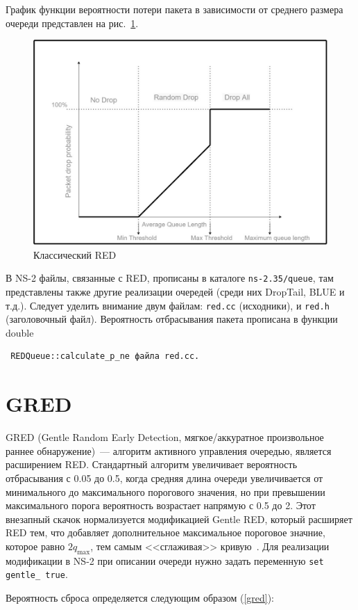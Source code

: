 График функции вероятности потери пакета в зависимости от среднего
размера очереди представлен на рис.~\ref{fig:2.1}.

\begin{figure}[!h]
  \centering
  \includegraphics[width=0.7\linewidth]{image/RED.png}
  \caption{Классический RED}
  \label{fig:2.1}
\end{figure}


В NS-2 файлы, связанные с RED, прописаны в каталоге
\verb|ns-2.35/queue|, там представлены также другие реализации
очередей (среди них DropTail, BLUE и т.д.). Следует уделить внимание
двум файлам: \verb|red.cc| (исходники), и \verb|red.h| (заголовочный
файл). Вероятность отбрасывания пакета прописана в функции
double \begin{verbatim} REDQueue::calculate_p_ne файла red.cc. \end{verbatim}


\section{GRED} 

GRED (Gentle Random Early Detection, мягкое/аккуратное произвольное
раннее обнаружение)~--- алгоритм активного управления очередью,
является расширением RED.  Стандартный алгоритм увеличивает
вероятность отбрасывания с 0.05 до 0.5, когда средняя длина очереди
увеличивается от минимального до максимального порогового значения, но
при превышении максимального порога вероятность возрастает напрямую с
0.5 до 2.  Этот внезапный скачок нормализуется модификацией Gentle
RED, который расширяет RED тем, что добавляет дополнительное
максимальное пороговое значние, которое равно $2q_{\max}$, тем самым
<<сглаживая>> кривую~\cite{GRED}. Для реализации модификации в NS-2
при описании очереди нужно задать переменную \verb|set gentle_ true|.

Вероятность сброса определяется следующим образом (\ref{gred}):


